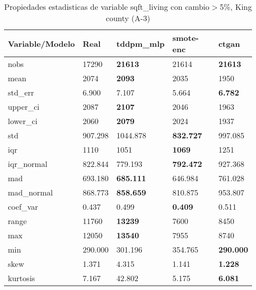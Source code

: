 \begin{table}[H]
\centering
\fontsize{8}{14}\selectfont
\caption{Propiedades estadisticas de variable sqft\_living con cambio\ensuremath{>}5\%, King county (A-3)}
\label{table-stats-king county-a-3-sqft_living-short}
\begin{tabular}{|l|m{10em}|m{10em}|m{10em}|m{10em}|}
\hline
 \rowcolor[gray]{0.8}
Variable/Modelo & Real & tddpm\_mlp & smote-enc & ctgan \\
\hline nobs & 17290 & \bfseries 21613 & \cellcolor[rgb]{0.9, 0.54, 0.52} 21614 & \bfseries 21613 \\
\hline mean & 2074 & \bfseries 2093 & 2035 & \cellcolor[rgb]{0.9, 0.54, 0.52} 1950 \\
\hline std\_err & 6.900 & 7.107 & \cellcolor[rgb]{0.9, 0.54, 0.52} 5.664 & \bfseries 6.782 \\
\hline upper\_ci & 2087 & \bfseries 2107 & 2046 & \cellcolor[rgb]{0.9, 0.54, 0.52} 1963 \\
\hline lower\_ci & 2060 & \bfseries 2079 & 2024 & \cellcolor[rgb]{0.9, 0.54, 0.52} 1937 \\
\hline std & 907.298 & \cellcolor[rgb]{0.9, 0.54, 0.52} 1044.878 & \bfseries 832.727 & 997.085 \\
\hline iqr & 1110 & 1051 & \bfseries 1069 & \cellcolor[rgb]{0.9, 0.54, 0.52} 1251 \\
\hline iqr\_normal & 822.844 & 779.193 & \bfseries 792.472 & \cellcolor[rgb]{0.9, 0.54, 0.52} 927.368 \\
\hline mad & 693.180 & \bfseries 685.111 & 646.984 & \cellcolor[rgb]{0.9, 0.54, 0.52} 761.028 \\
\hline mad\_normal & 868.773 & \bfseries 858.659 & 810.875 & \cellcolor[rgb]{0.9, 0.54, 0.52} 953.807 \\
\hline coef\_var & 0.437 & 0.499 & \bfseries 0.409 & \cellcolor[rgb]{0.9, 0.54, 0.52} 0.511 \\
\hline range & 11760 & \bfseries 13239 & \cellcolor[rgb]{0.9, 0.54, 0.52} 7600 & 8450 \\
\hline max & 12050 & \bfseries 13540 & \cellcolor[rgb]{0.9, 0.54, 0.52} 7955 & 8740 \\
\hline min & 290.000 & 301.196 & \cellcolor[rgb]{0.9, 0.54, 0.52} 354.765 & \bfseries 290.000 \\
\hline skew & 1.371 & \cellcolor[rgb]{0.9, 0.54, 0.52} 4.315 & 1.141 & \bfseries 1.228 \\
\hline kurtosis & 7.167 & \cellcolor[rgb]{0.9, 0.54, 0.52} 42.802 & 5.175 & \bfseries 6.081 \\

\end{tabular}
\end{table}
